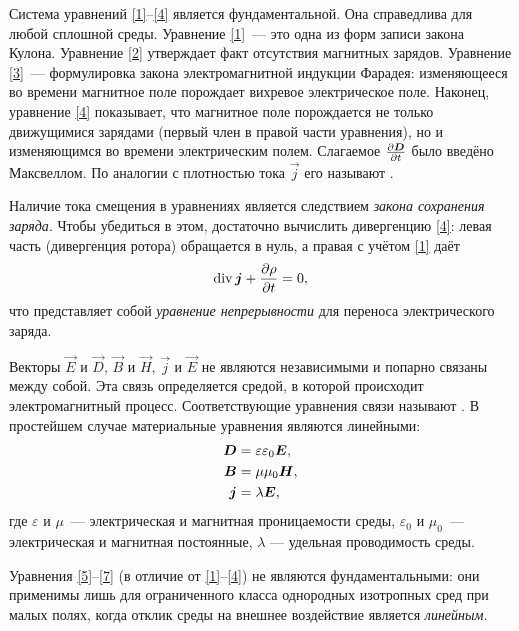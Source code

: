 Система уравнений \eqref{1}--\eqref{4} является фундаментальной. Она справедлива
для любой сплошной среды. Уравнение \eqref{1}~--- это одна из форм записи закона Кулона. 
Уравнение \eqref{2} утверждает факт отсутствия магнитных зарядов.
Уравнение \eqref{3}~--- формулировка закона электромагнитной индукции Фарадея: 
изменяющееся во времени магнитное поле порождает вихревое электрическое поле.
Наконец, уравнение \eqref{4} показывает, что магнитное поле порождается не только 
движущимися зарядами (первый член в правой части уравнения), но и изменяющимся 
во времени электрическим полем. Слагаемое $\frac{\partial {\boldsymbol{D}}}{\partial t}$ было введёно Максвеллом.
По аналогии с плотностью тока $\vec{j}$ его называют .

\begin{lab:note}
Наличие тока смещения в уравнениях является следствием \emph{закона сохранения заряда}.
Чтобы убедиться в этом, достаточно вычислить дивергенцию \eqref{4}:
левая часть (дивергенция ротора) обращается в нуль, а правая с учётом 
\eqref{1} даёт
\begin{equation}
\eqmark{cont}
\Div \vec{j} + \ddt{\rho} = 0,
\end{equation}
что представляет собой \emph{уравнение непрерывности} для переноса электрического заряда.
\end{lab:note}
 
Векторы $\vec{E}$ и $\vec{D}$, $\vec{B}$ и $\vec{H}$, $\vec{j}$ и $\vec{E}$ 
не являются независимыми и попарно связаны между собой. Эта связь определяется средой, 
в которой происходит электромагнитный процесс. 
Соответствующие уравнения связи называют .
В простейшем случае материальные уравнения являются линейными:
\begin{align}
\eqmark{5}
\vec{D}&=\varepsilon\varepsilon_0\vec{E},\\
\eqmark{6}
\vec{B}&=\mu\mu_0\vec{H},\\
\eqmark{7}
\vec{j}&=\lambda\vec{E},
\end{align}
где $\varepsilon$ и $\mu$~--- электрическая и магнитная проницаемости среды,
$\varepsilon_0$ и $\mu_0$~--- электрическая и магнитная постоянные,
$\lambda$ --- удельная проводимость среды.
\begin{lab:note}
Уравнения \eqref{5}--\eqref{7} (в отличие от \eqref{1}--\eqref{4})
не являются фундаментальными: они применимы лишь для ограниченного класса 
однородных изотропных сред при малых полях, когда отклик среды на внешнее
воздействие является \emph{линейным}.
\end{lab:note}

